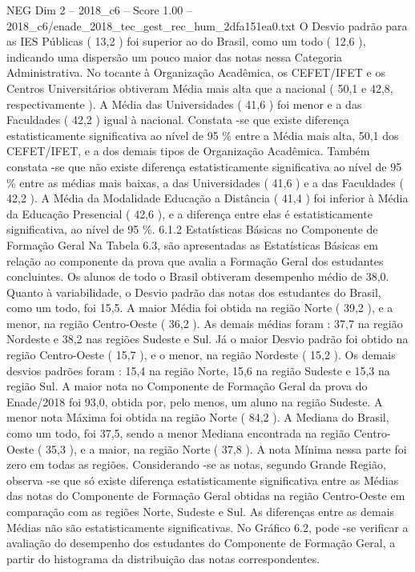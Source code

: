\begin{textsample}{NEG Dim 2 – 2018\_c6 – Score 1.00 – 2018\_c6/enade\_2018\_tec\_gest\_rec\_hum\_2dfa151ea0.txt}
O Desvio padrão para as IES Públicas ( 13,2 ) foi superior ao do Brasil, como um todo ( 12,6 ), indicando uma dispersão um pouco maior das notas nessa Categoria Administrativa.
No tocante à Organização Acadêmica, os CEFET/IFET e os Centros Universitários obtiveram Média mais alta que a nacional ( 50,1 e 42,8, respectivamente ).
A Média das Universidades ( 41,6 ) foi menor e a das Faculdades ( 42,2 ) igual à nacional.
Constata -se que existe diferença estatisticamente significativa ao nível de 95 \% entre a Média mais alta, 50,1 dos CEFET/IFET, e a dos demais tipos de Organização Acadêmica.
Também constata -se que não existe diferença estatisticamente significativa ao nível de 95 \% entre as médias mais baixas, a das Universidades ( 41,6 ) e a das Faculdades ( 42,2 ).
A Média da Modalidade Educação a Distância ( 41,4 ) foi inferior à Média da Educação Presencial ( 42,6 ), e a diferença entre elas é estatisticamente significativa, ao nível de 95 \%. 6.1.2 Estatísticas Básicas no Componente de Formação Geral Na Tabela 6.3, são apresentadas as Estatísticas Básicas em relação ao componente da prova que avalia a Formação Geral dos estudantes concluintes.
Os alunos de todo o Brasil obtiveram desempenho médio de 38,0.
Quanto à variabilidade, o Desvio padrão das notas dos estudantes do Brasil, como um todo, foi 15,5.
A maior Média foi obtida na região Norte ( 39,2 ), e a menor, na região Centro-Oeste ( 36,2 ).
As demais médias foram : 37,7 na região Nordeste e 38,2 nas regiões Sudeste e Sul.
Já o maior Desvio padrão foi obtido na região Centro-Oeste ( 15,7 ), e o menor, na região Nordeste ( 15,2 ).
Os demais desvios padrões foram : 15,4 na região Norte, 15,6 na região Sudeste e 15,3 na região Sul.
A maior nota no Componente de Formação Geral da prova do Enade/2018 foi 93,0, obtida por, pelo menos, um aluno na região Sudeste.
A menor nota Máxima foi obtida na região Norte ( 84,2 ).
A Mediana do Brasil, como um todo, foi 37,5, sendo a menor Mediana encontrada na região Centro-Oeste ( 35,3 ), e a maior, na região Norte ( 37,8 ).
A nota Mínima nessa parte foi zero em todas as regiões.
Considerando -se as notas, segundo Grande Região, observa -se que só existe diferença estatisticamente significativa entre as Médias das notas do Componente de Formação Geral obtidas na região Centro-Oeste em comparação com as regiões Norte, Sudeste e Sul.
As diferenças entre as demais Médias não são estatisticamente significativas.
No Gráfico 6.2, pode -se verificar a avaliação do desempenho dos estudantes do Componente de Formação Geral, a partir do histograma da distribuição das notas correspondentes.

\end{textsample}
